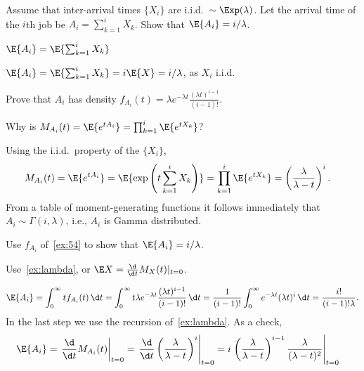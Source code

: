 \begin{exercise}\label{ex:30}
 Assume  that inter-arrival times $\{X_i\}$ are i.i.d.\ $\sim\Exp(\lambda)$. Let
the arrival time of the $i$th job be $A_i=\sum_{k=1}^i X_k$. Show that
$\E{A_i} = i/\lambda$.
\begin{hint}
$\E{A_i} = \E{\sum_{k=1}^i X_k}$
\end{hint}
\begin{solution}
$\E{A_i} = \E{\sum_{k=1}^i X_k} = i \E{X} =  i/ \lambda$, as $X_i$ i.i.d.
\end{solution}
\end{exercise}

\begin{exercise}\label{ex:54}
 Prove that $A_i$ has density 
$f_{A_i}(t) = \lambda e^{-\lambda t} \frac{(\lambda t)^{i-1}}{(i-1)!}$.
\begin{hint}
Why is $M_{A_i}(t) = \E{e^{t A_i}} = \prod_{k=1}^{i} \E{e^{tX_k}}$?
\end{hint}
\begin{solution}
 Using the i.i.d.\ property of the $\{X_i\}$,
\begin{align*}
 M_{A_i}(t) &= \E{e^{t A_i}} = \E{\exp\left(t\sum_{k=1}^{i} X_k\right)}  = \prod_{k=1}^{i} \E{e^{tX_k}} =
  \left(\frac{\lambda}{\lambda -t }\right)^i.
\end{align*}
From a table of moment-generating functions it follows immediately that
$A_i \sim \Gamma(i,\lambda)$, i.e., $A_i$ is Gamma distributed.
\end{solution}
\end{exercise}

\begin{exercise}
 Use   $f_{A_i}$ of~\cref{ex:54} to show that $\E{A_i}=i/\lambda$.
\begin{hint}
Use~\cref{ex:lambda}, or $\E X = \frac{\d}{\d t} M_X(t) |_{t=0}$.
\end{hint}
\begin{solution}
 \begin{equation*}
\E{A_i} = \int_0^\infty t f_{A_i} (t) \, \d t =
\int_0^\infty t \lambda e^{-\lambda t} \frac{(\lambda t)^{i-1}}{(i-1)!}\, \d t = \frac{1}{(i-1)!} \int_0^\infty e^{-\lambda t} (\lambda t)^i\,\d t = \frac{i!}{(i-1)!\lambda}.
\end{equation*}
In the last step we use the recursion of~\cref{ex:lambda}.
As a check,
\begin{align*}
 \E{A_i}
&= \left.\frac{\d}{\d t} M_{A_i}(t)\right|_{t=0}
= \left.\frac{\d}{\d t} \left(\frac{\lambda}{\lambda-t}\right)^i\right|_{t=0}
= i \left.\left(\frac{\lambda}{\lambda-t}\right)^{i-1}\frac{\lambda}{(\lambda-t)^2}\right|_{t=0}
\end{align*}


\end{solution}
\end{exercise}

